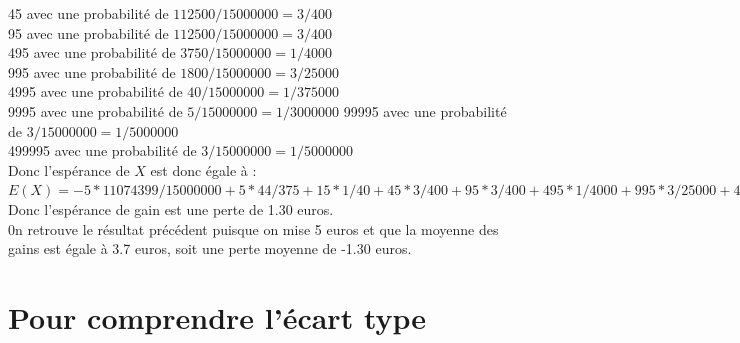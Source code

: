 \documentclass[a4paper,11pt]{book}
\begin{document}
45  avec une probabilit\'e de $112500/15000000=3/400$\\
95  avec une probabilit\'e de $112500/15000000=3/400$\\
495  avec une probabilit\'e de $ 3750/15000000=1/4000$\\
995   avec une probabilit\'e de $1800 /15000000=3/25000$\\
4995   avec une probabilit\'e de $40/15000000=1/375000$\\
9995 avec une probabilit\'e de $5/15000000=1/3000000$
99995  avec une probabilit\'e de $3/15000000=1/5000000$\\ 
499995 avec une probabilit\'e de $3/15000000=1/5000000$\\
Donc l'esp\'erance de $X$ est donc \'egale \`a :\\
$E(X)=-5*11074399/15000000+5*44/375+15*1/40+45*3/400+95*3/400+
495*1/4000+995*3/25000+4995*1/375000+9995*1/3000000+99995*1/5000000+
499995*1/5000000=-13/10$
Donc l'esp\'erance de gain est une perte de 1.30 euros.\\
0n retrouve le r\'esultat pr\'ec\'edent puisque on mise 5 euros et que la 
moyenne des gains est \'egale \`a 3.7 euros, soit une perte moyenne de 
-1.30 euros.

\section{Pour comprendre l'\'ecart type}
\end{document}
